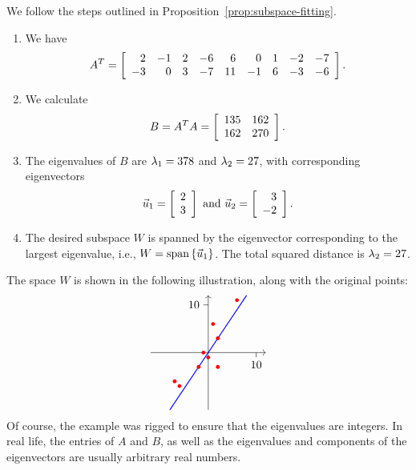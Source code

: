 \documentclass{ximera}
\begin{document}
\begin{solution}
  We follow the steps outlined in
  Proposition~\ref{prop:subspace-fitting}.
  \begin{enumerate}
  \item We have
    \begin{equation*}
      A^T = \startmat{rrrrrrrrr}
        2 & -1 & 2 & -6 & 6 & 0 & 1 & -2 & -7 \\
        -3 & 0 & 3 & -7 & 11 & -1 & 6 & -3 & -6
      \stopmat.
    \end{equation*}
  \item We calculate
    \begin{equation*}
      B = A^TA = \startmat{rr}
        135 & 162 \\
        162 & 270
      \stopmat.
    \end{equation*}
  \item The eigenvalues of $B$ are $\eigenvar_1 = 378$ and
    $\eigenvar_2 = 27$, with corresponding eigenvectors
    \begin{equation*}
      \vect{u}_1 = \startmat{r} 2 \\ 3 \stopmat
      \quad\mbox{and}\quad
      \vect{u}_2 = \startmat{r} 3 \\ -2 \stopmat.
    \end{equation*}
  \item The desired subspace $W$ is spanned by the eigenvector
    corresponding to the largest eigenvalue, i.e.,
    $W=\sspan\set{\vect{u}_1}$. The total squared distance is
    $\eigenvar_2 = 27$.
  \end{enumerate}
  The space $W$ is shown in the following illustration, along with the
  original points:
  \begin{equation*}
    \begin{tikzpicture}[scale=0.15]
      \draw[thin,->] (-12,0) -- (12,0);
      \draw[thin,->] (0,-12) -- (0,12);
      \draw[thin] (0,10) -- (-1,10) node[left] {$10$};
      \draw[thin] (10,0) -- (10,-1) node[below] {$10$};
      \draw[thick,blue] (-8,-12) -- (8,12);
      \fill[color=red] (2,-3) circle (0.4);
      \fill[color=red] (-1, 0) circle (0.4);
      \fill[color=red] (2, 3) circle (0.4);
      \fill[color=red] (-6, -7) circle (0.4);
      \fill[color=red] (6, 11) circle (0.4);
      \fill[color=red] (0, -1) circle (0.4);
      \fill[color=red] (1, 6) circle (0.4);
      \fill[color=red] (-2, -3) circle (0.4);
      \fill[color=red] (-7, -6) circle (0.4);
    \end{tikzpicture}
  \end{equation*}
  Of course, the example was rigged to ensure that the eigenvalues are
  integers. In real life, the entries of $A$ and $B$, as well as the
  eigenvalues and components of the eigenvectors are usually arbitrary
  real numbers.
\end{solution}
\end{document}
